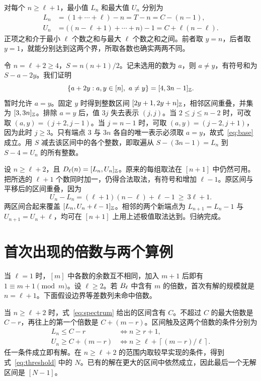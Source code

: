 \documentclass[11pt,a4paper]{article}
\begin{document}
对每个 \(n\ge\ell+1\)，最小值 \(L_n\) 和最大值 \(U_n\) 分别为
\begin{align*}
 L_n &= (1+\cdots+\ell)-n=T-n=C-(n-1),\\
 U_n &= \bigl((n-\ell+1)+\cdots+n\bigr)-1=C+\ell(n-\ell).
\end{align*}
正项之和介于最小 \(\ell\) 个数之和与最大 \(\ell\) 个数之和之间。前者取 \(y=n\)，后者取 \(y=1\)，就能分别达到这两个界，所取各数也确实两两不同。

令 \(n=\ell+2\ge4\)，\(S=n(n+1)/2\)。记未选用的数为 \(a\)，则 \(a\ne y\)，有符号和为 \(S-a-2y\)。我们证明
\begin{equation}\label{eq:base}
 \{a+2y:a,y\in[n],\ a\ne y\}=[4,3n-1]_{\mathbb Z}.
\end{equation}
暂时允许 \(a=y\)。固定 \(y\) 时得到整数区间 \([2y+1,2y+n]_{\mathbb Z}\)，相邻区间重叠，并集为 \([3,3n]_{\mathbb Z}\)。排除 \(a=y\) 后，值 \(3j\) 失去表示 \((j,j)\)。当 \(2\le j\le n-2\) 时，可改取 \((a,y)=(j+2,j-1)\)。当 \(j=n-1\) 时，可取 \((a,y)=(j-2,j+1)\)，因为此时 \(j\ge3\)。只有端点 \(3\) 与 \(3n\) 各自的唯一表示必须取 \(a=y\)，故式~\eqref{eq:base} 成立。用 \(S\) 减去该区间中的各个整数，即取遍从 \(S-(3n-1)=L_n\) 到 \(S-4=U_n\) 的所有整数。

设 \(n\ge\ell+2\)，且 \(D_\ell(n)=[L_n,U_n]_{\mathbb Z}\)。原来的每组取法在 \([n+1]\) 中仍然可用。把所选的 \(\ell+1\) 个数同时加一，仍得合法取法，有符号和增加 \(\ell-1\)。原区间与平移后的区间重叠，因为
\[
 U_n-L_n=(\ell+1)(n-\ell)+\ell-1\ \ge\ 3\ell+1 .
\]
两区间合起来覆盖 \([L_n,U_n+\ell-1]_{\mathbb Z}\)。相邻的两个新端点为 \(L_{n+1}=L_n-1\) 与 \(U_{n+1}=U_n+\ell\)，均可在 \([n+1]\) 上用上述极值取法达到。归纳完成。\proofsquare

\clearpage
\section{首次出现的倍数与两个算例}
当 \(\ell=1\) 时，\([m]\) 中各数的余数互不相同，加入 \(m+1\) 后即有 \(1\equiv m+1\pmod m\)。设 \(\ell\ge2\)。若 \(B_\ell\) 中含有 \(m\) 的倍数，首次有解的规模就是 \(n=\ell+1\)。下面假设边界等差数列未命中倍数。

当 \(n\ge\ell+2\) 时，式~\eqref{eq:spectrum} 给出的区间含有 \(C\)。不超过 \(C\) 的最大倍数是 \(C-r\)，再往上的第一个倍数是 \(C+(m-r)\)。区间触及这两个倍数的条件分别为
\begin{align*}
 L_n\le C-r &\iff n\ge r+1,\\
 U_n\ge C+(m-r) &\iff n\ge \ell+\left\lceil(m-r)/\ell\right\rceil .
\end{align*}
任一条件成立即有解。在 \(n\ge\ell+2\) 的范围内取较早实现的条件，得到式~\eqref{eq:threshold} 中的 \(N\)。已有的解在更大的区间中依然成立，因此最后一个无解区间是 \([N-1]\)。\proofsquare
\end{document}
